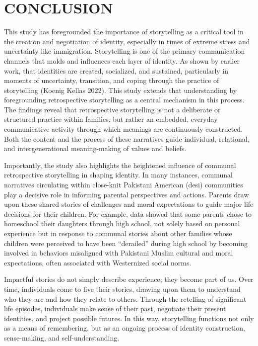 \chapter{\texorpdfstring{CONCLUSION}{}} %

This study has foregrounded the importance of storytelling as a critical tool in the creation and negotiation of identity, especially in times of extreme stress and uncertainty like immigration. Storytelling is one of the primary communication channels that molds and influences each layer of identity. As shown by earlier work, that identities are created, socialized, and sustained, particularly in moments of uncertainty, transition, and coping through the practice of storytelling (Koenig Kellas 2022). This study extends that understanding by foregrounding retrospective storytelling as a central mechanism in this process. The findings reveal that retrospective storytelling is not a deliberate or structured practice within families, but rather an embedded, everyday communicative activity through which meanings are continuously constructed. Both the content and the process of these narratives guide individual, relational, and intergenerational meaning-making of values and beliefs.

Importantly, the study also highlights the heightened influence of communal retrospective storytelling in shaping identity. In many instances, communal narratives circulating within close-knit Pakistani American (desi) communities play a decisive role in informing parental perspectives and actions. Parents draw upon these shared stories of challenges and moral expectations to guide major life decisions for their children. For example, data showed that some parents chose to homeschool their daughters through high school, not solely based on personal experience but in response to communal stories about other families whose children were perceived to have been “derailed” during high school by becoming involved in behaviors misaligned with Pakistani Muslim cultural and moral expectations, often associated with Westernized social norms. 

Impactful stories do not simply describe experience; they become part of us. Over time, individuals come to live their stories, drawing upon them to understand who they are and how they relate to others. Through the retelling of significant life episodes, individuals make sense of their past, negotiate their present identities, and project possible futures. In this way, storytelling functions not only as a means of remembering, but as an ongoing process of identity construction, sense-making, and self-understanding.

